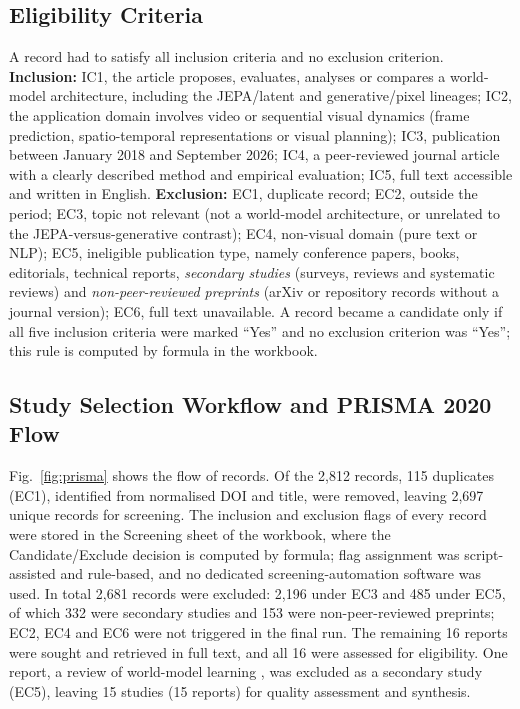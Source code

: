 \documentclass[conference,a4paper]{IEEEtran}
\begin{document}
\subsection{Eligibility Criteria}
A record had to satisfy all inclusion criteria and no exclusion criterion. \textbf{Inclusion:} IC1, the article proposes, evaluates, analyses or compares a world-model architecture, including the JEPA/latent and generative/pixel lineages; IC2, the application domain involves video or sequential visual dynamics (frame prediction, spatio-temporal representations or visual planning); IC3, publication between January 2018 and September 2026; IC4, a peer-reviewed journal article with a clearly described method and empirical evaluation; IC5, full text accessible and written in English. \textbf{Exclusion:} EC1, duplicate record; EC2, outside the period; EC3, topic not relevant (not a world-model architecture, or unrelated to the JEPA-versus-generative contrast); EC4, non-visual domain (pure text or NLP); EC5, ineligible publication type, namely conference papers, books, editorials, technical reports, \emph{secondary studies} (surveys, reviews and systematic reviews) and \emph{non-peer-reviewed preprints} (arXiv or repository records without a journal version); EC6, full text unavailable. A record became a candidate only if all five inclusion criteria were marked ``Yes'' and no exclusion criterion was ``Yes''; this rule is computed by formula in the workbook.

\subsection{Study Selection Workflow and PRISMA 2020 Flow}
Fig.~\ref{fig:prisma} shows the flow of records. Of the 2,812 records, 115 duplicates (EC1), identified from normalised DOI and title, were removed, leaving 2,697 unique records for screening. The inclusion and exclusion flags of every record were stored in the Screening sheet of the workbook, where the Candidate/Exclude decision is computed by formula; flag assignment was script-assisted and rule-based, and no dedicated screening-automation software was used. %
In total 2,681 records were excluded: 2,196 under EC3 and 485 under EC5, of which 332 were secondary studies and 153 were non-peer-reviewed preprints; EC2, EC4 and EC6 were not triggered in the final run. The remaining 16 reports were sought and retrieved in full text, and all 16 were assessed for eligibility. One report, a review of world-model learning \cite{friston2021world}, was excluded as a secondary study (EC5), leaving 15 studies (15 reports) for quality assessment and synthesis.
\end{document}
